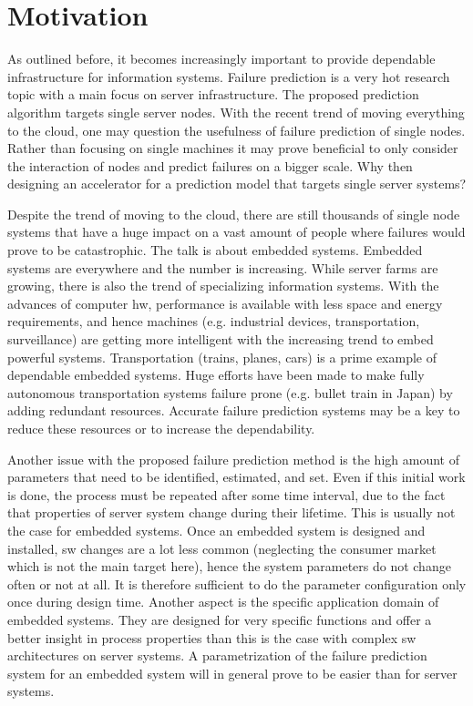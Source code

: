 \documentclass[mscthesis]{usiinfthesis}
\begin{document}
\section{Motivation}
\label{ch:intro_mot}

As outlined before, it becomes increasingly important to provide dependable
infrastructure for information systems. Failure prediction is a very hot
research topic with a main focus on server infrastructure. The proposed
prediction algorithm targets single server nodes. With the recent trend of
moving everything to the cloud, one may question the usefulness of failure
prediction of single nodes. Rather than focusing on single machines it may
prove beneficial to only consider the interaction of nodes and predict failures
on a bigger scale. Why then designing an accelerator for a prediction model
that targets single server systems?

Despite the trend of moving to the cloud, there are still thousands of single
node systems that have a huge impact on a vast amount of people where failures
would prove to be catastrophic. The talk is about embedded systems. Embedded
systems are everywhere and the number is increasing. While server farms are
growing, there is also the trend of specializing information systems. With the
advances of computer \gls{hw}, performance is available with less space and
energy requirements, and hence machines (e.g. industrial devices,
transportation, surveillance) are getting more intelligent with the increasing
trend to embed powerful systems. Transportation (trains, planes, cars) is
a prime example of dependable embedded systems. Huge efforts have been made to
make fully autonomous transportation systems failure prone (e.g. bullet train
in Japan) by adding redundant resources. Accurate failure prediction systems
may be a key to reduce these resources or to increase the dependability.

Another issue with the proposed failure prediction method is the high amount of
parameters that need to be identified, estimated, and set. Even if this initial
work is done, the process must be repeated after some time interval, due to the
fact that properties of server system change during their lifetime. This is
usually not the case for embedded systems. Once an embedded system is designed
and installed, \gls{sw} changes are a lot less common (neglecting the consumer
market which is not the main target here), hence the system parameters do not
change often or not at all. It is therefore sufficient to do the parameter
configuration only once during design time. Another aspect is the specific
application domain of embedded systems. They are designed for very specific
functions and offer a better insight in process properties than this is the
case with complex \gls{sw} architectures on server systems. A parametrization
of the failure prediction system for an embedded system will in general prove
to be easier than for server systems.
\end{document}
